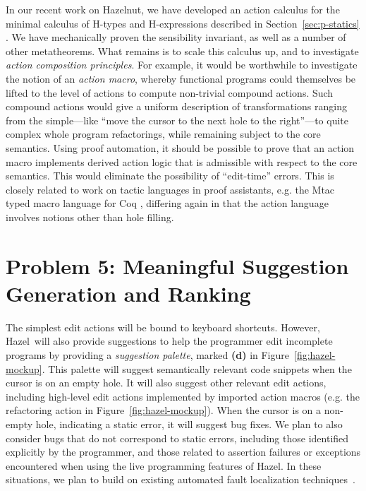 \documentclass[letterpaper,USenglish]{lipics-v2016}
\newcommand{\Hazel}[0]{\textsf{Hazel}}
\newcommand{\HazelEnv}[0]{\Hazel}
\begin{document}
In our recent work on Hazelnut, we have developed an action calculus
for the minimal calculus of H-types and H-expressions described in
Section~\ref{sec:p-statics} \cite{popl-paper}. We have mechanically proven the sensibility invariant, as well as a number of other metatheorems. What remains is to scale this calculus up, 
and to investigate \emph{action composition principles}. For example, it would be worthwhile to investigate the 
notion of an \emph{action macro}, whereby 
functional programs could themselves be lifted to the level of actions to
compute non-trivial compound actions. Such compound actions would give a
uniform description of transformations ranging from the simple---like
``move the cursor to the next hole to the right''---to quite complex whole
program refactorings, while r{}emaining subject to the core semantics. Using proof automation, it should be possible to prove that an action macro implements derived action logic that 
is admissible with respect to the core semantics. This would eliminate the possibility of ``edit-time'' errors. This is closely related to work on tactic languages in proof assistants, e.g. the Mtac typed macro language for Coq \cite{ziliani2015mtac}, differing again in that the action language involves notions other than hole filling. 

\section{Problem 5: Meaningful Suggestion Generation and Ranking} 
The simplest 
edit actions will be bound to keyboard shortcuts. However, \Hazel ~will also provide suggestions to help the programmer edit incomplete
programs by providing a \emph{suggestion palette}, marked \textbf{(d)} in
Figure~\ref{fig:hazel-mockup}.  This palette will suggest semantically
relevant code  
snippets when the cursor is on an empty hole. It will also suggest other relevant
edit actions, including high-level edit actions implemented by imported action
macros (e.g. the refactoring action in Figure~\ref{fig:hazel-mockup}).  When the
cursor is on a non-empty hole, indicating a static error, it will suggest
bug fixes. We plan to also consider bugs that do not correspond to static
errors, including those identified explicitly by the programmer, and those
related to assertion failures or exceptions encountered when using the live
programming features of \HazelEnv. In these situations, we plan to build on 
existing automated fault localization techniques~\cite{Jones02,
  Qi13issta,Renieris03}.
\end{document}
